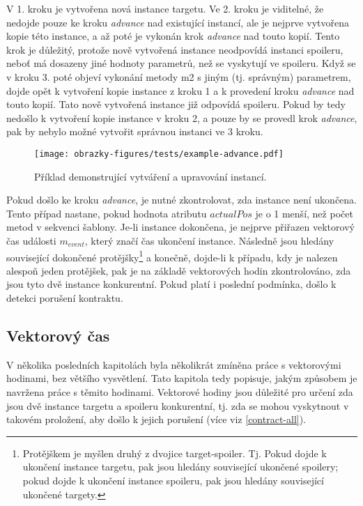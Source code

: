 \begin{exmp}
\begin{enumerate}
\end{enumerate}  

V 1. kroku je vytvořena nová instance targetu. Ve 2. kroku je viditelné, že nedojde pouze ke kroku \textit{advance} nad existující instancí, ale je nejprve vytvořena kopie této instance, a až poté je vykonán krok \textit{advance} nad touto kopií. Tento krok je důležitý, protože nově vytvořená instance neodpovídá instanci spoileru, neboť má dosazeny jiné hodnoty parametrů, než se vyskytují ve spoileru. Když se v kroku 3. poté objeví vykonání metody m2 s jiným (tj. správným) parametrem, dojde opět k vytvoření kopie instance z kroku 1 a k provedení kroku \textit{advance} nad touto kopií. Tato nově vytvořená instance již odpovídá spoileru. Pokud by tedy nedošlo k vytvoření kopie instance v kroku 2, a pouze by se provedl krok \textit{advance}, pak by nebylo možné vytvořit správnou instanci ve 3 kroku.

\begin{figure}[!htbp]
    \centering
    \texttt{[image: obrazky-figures/tests/example-advance.pdf]}
    \caption{Příklad demonstrující vytváření a upravování instancí.}
    \label{test-param-copy}
\end{figure}

\end{exmp}

Pokud došlo ke kroku \textit{advance}, je nutné zkontrolovat, zda instance není ukončena. Tento případ nastane, pokud hodnota atributu $actualPos$ je o 1 menší, než počet metod v sekvenci šablony. Je-li instance dokončena, je nejprve přiřazen vektorový čas události $m_{event}$, který značí čas ukončení instance. Následně jsou hledány související dokončené protějšky\footnote{Protějškem je myšlen druhý z dvojice target-spoiler. Tj. Pokud dojde k ukončení instance targetu, pak jsou hledány související ukončené spoilery; pokud dojde k ukončení instance spoileru, pak jsou hledány související ukončené targety.} a konečně, dojde-li k případu, kdy je nalezen alespoň jeden protějšek, pak je na základě vektorových hodin zkontrolováno, zda jsou tyto dvě instance konkurentní. Pokud platí i poslední podmínka, došlo k detekci porušení kontraktu.

\subsection{Vektorový čas}\label{vs-navrh}

V několika posledních kapitolách byla několikrát zmíněna práce s vektorovými hodinami, bez většího vysvětlení. Tato kapitola tedy popisuje, jakým způsobem je navržena práce s těmito hodinami. Vektorové hodiny jsou důležité pro určení zda jsou dvě instance targetu a spoileru konkurentní, tj. zda se mohou vyskytnout v takovém proložení, aby došlo k jejich porušení (více viz \ref{contract-all}).

